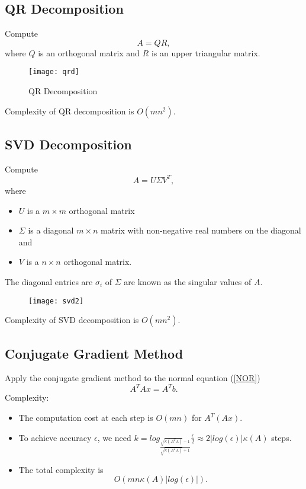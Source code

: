 \subsection{QR Decomposition}

Compute
$$A = QR,$$
where $Q$ is an orthogonal matrix and $R$ is an upper triangular matrix.

 \begin{figure}[htbp]
    \texttt{[image: qrd]}
    \caption{QR Decomposition}
\end{figure}

Complexity of QR decomposition is {\color{red} $O(mn^2)$}.



\subsection{SVD Decomposition}

Compute
$$
A = U \Sigma V^T,
$$
where
\begin{itemize}
\item $U$ is a $m \times m $ orthogonal matrix \\
\item $\Sigma$ is a diagonal $m \times n$ matrix with non-negative real numbers on the diagonal and \\
\item $V$ is a $n \times n $ orthogonal matrix.
\end{itemize}
The diagonal entries are $\sigma_i$ of $\Sigma$ are known as the singular values of $A$. \\
 \begin{figure}[htbp]
    \texttt{[image: svd2]}
\end{figure}
Complexity of SVD decomposition is {\color{red} $O(mn^2)$}.





\subsection{Conjugate Gradient Method}

Apply the conjugate gradient method to the normal equation (\ref{NOR})
$$
A^T A x = A^T b.
$$
Complexity:
\begin{itemize}
\item The computation cost at each step is  $O(mn)$  for $A^T(Ax)$. \\
\item To achieve accuracy $\epsilon$, we need $ k = log_{\frac{\sqrt{\kappa(A^T A)} -1}{\sqrt{\kappa(A^T A)} +1}} \frac{\epsilon}{2} \approx 2 |log(\epsilon)|\kappa(A)$ steps. \\
\item The total complexity is
{\color{red}
$$
O(m n \kappa(A) |log(\epsilon)|).
$$
}
\end{itemize}

